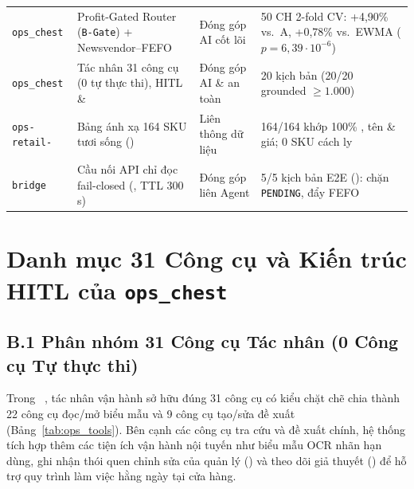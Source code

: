 \begin{table}[H]
\begin{tabularx}{\textwidth}{L{2.2cm} L{3.6cm} L{2.3cm} Y}
\texttt{ops\_chest} & Profit-Gated Router (\texttt{B-Gate}) + Newsvendor--FEFO & Đóng góp AI cốt lõi & 50 CH 2-fold CV: +4,90\% vs.\ A, +0,78\% vs.\ EWMA ($p=6{,}39\cdot 10^{-6}$) \\
\texttt{ops\_chest} & Tác nhân 31 công cụ (0 tự thực thi), HITL \&  & Đóng góp AI \& an toàn & 20 kịch bản  (20/20 grounded $\ge 1.000$) \\
\midrule
\texttt{ops-retail-} & Bảng ánh xạ 164 SKU tươi sống () & Liên thông dữ liệu & 164/164 khớp 100\% , tên \& giá; 0 SKU cách ly \\
\texttt{bridge} & Cầu nối API chỉ đọc fail-closed (, TTL 300\,s) & Đóng góp liên Agent & 5/5 kịch bản E2E (): chặn \texttt{PENDING}, đẩy FEFO \\
\bottomrule
\end{tabularx}
\end{table}

\chapter{Danh mục 31 Công cụ và Kiến trúc HITL của \texttt{ops\_chest}}
\label{app:ops_chest}

\section*{B.1 Phân nhóm 31 Công cụ Tác nhân (0 Công cụ Tự thực thi)}
Trong ~\cite{ops_chest_repo}, tác nhân vận hành sở hữu đúng 31 công cụ có kiểu chặt chẽ chia thành 22 công cụ đọc/mở biểu mẫu và 9 công cụ tạo/sửa đề xuất (Bảng~\ref{tab:ops_tools}). Bên cạnh các công cụ tra cứu và đề xuất chính, hệ thống tích hợp thêm các tiện ích vận hành nội tuyến như biểu mẫu OCR nhãn hạn dùng, ghi nhận thói quen chỉnh sửa của quản lý () và theo dõi giả thuyết () để hỗ trợ quy trình làm việc hằng ngày tại cửa hàng.


